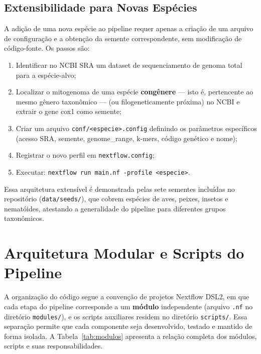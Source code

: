 \subsection{Extensibilidade para Novas Espécies}

A adição de uma nova espécie ao pipeline requer apenas a criação de um arquivo de configuração e a obtenção da semente correspondente, sem modificação de código-fonte. Os passos são:

\begin{enumerate}
    \item Identificar no NCBI SRA um dataset de sequenciamento de genoma total para a espécie-alvo;
    \item Localizar o mitogenoma de uma espécie \textbf{congênere} --- isto é, pertencente ao mesmo gênero taxonômico --- (ou filogeneticamente próxima) no NCBI e extrair o gene cox1 como semente;
    \item Criar um arquivo \texttt{conf/<especie>.config} definindo os parâmetros específicos (acesso SRA, semente, genome\_range, k-mers, código genético e nome);
    \item Registrar o novo perfil em \texttt{nextflow.config};
    \item Executar: \texttt{nextflow run main.nf -profile <especie>}.
\end{enumerate}

Essa arquitetura extensível é demonstrada pelas sete sementes incluídas no repositório (\texttt{data/seeds/}), que cobrem espécies de aves, peixes, insetos e nematóides, atestando a generalidade do pipeline para diferentes grupos taxonômicos.

\section{Arquitetura Modular e Scripts do Pipeline}

A organização do código segue a convenção de projetos Nextflow DSL2, em que cada etapa do pipeline corresponde a um \textbf{módulo} independente (arquivo \texttt{.nf} no diretório \texttt{modules/}), e os scripts auxiliares residem no diretório \texttt{scripts/}. Essa separação permite que cada componente seja desenvolvido, testado e mantido de forma isolada. A Tabela~\ref{tab:modulos} apresenta a relação completa dos módulos, scripts e suas responsabilidades.

